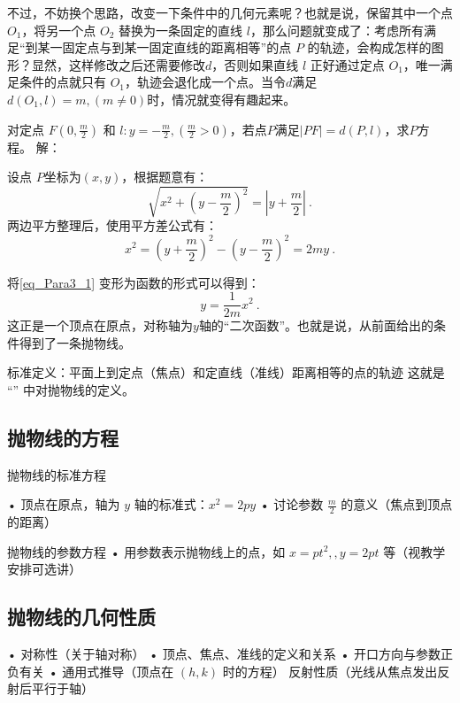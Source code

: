 不过，不妨换个思路，改变一下条件中的几何元素呢？也就是说，保留其中一个点 $O_1$，将另一个点 $O_2$ 替换为一条固定的直线 $l$，那么问题就变成了：考虑所有满足“到某一固定点与到某一固定直线的距离相等”的点 $P$ 的轨迹，会构成怎样的图形？显然，这样修改之后还需要修改$d$，否则如果直线 $l$ 正好通过定点 $O_1$，唯一满足条件的点就只有 $O_1$，轨迹会退化成一个点。当令$d$满足 $d(O_1,l)=m,(m\neq0)$时，情况就变得有趣起来。

\begin{example}{对定点 $F\left(0, \displaystyle\frac{m}{2}\right)$ 和 $l:y=-\displaystyle\frac{m}{2},\left(\frac{m}{2}>0\right)$，若点$P$满足$|PF|=d(P,l)$，求$P$方程。}
解：

设点 $P$坐标为$(x, y)$，根据题意有：
\begin{equation}
\sqrt{x^2+\left(y-\frac{m}{2}\right)^2}=\left|y +\frac{m}{2}\right|~.
\end{equation}
两边平方整理后，使用平方差公式有：
\begin{equation}\label{eq_Para3_1}
x^2=\left(y+\frac{m}{2}\right)^2-\left(y-\frac{m}{2}\right)^2=2my~.
\end{equation}
\end{example}

将\autoref{eq_Para3_1} 变形为函数的形式可以得到：
\begin{equation}
y=\frac{1}{2m}x^2~.
\end{equation}
这正是一个顶点在原点，对称轴为$y$轴的“二次函数”。也就是说，从前面给出的条件得到了一条抛物线。

标准定义：平面上到定点（焦点）和定直线（准线）距离相等的点的轨迹
这就是 “” 中对抛物线的定义。

\subsection{抛物线的方程}

\begin{theorem}{抛物线的标准方程}

\end{theorem}
	•	顶点在原点，轴为 $y$ 轴的标准式：$x^2=2py$
	•	讨论参数 $\displaystyle\frac{m}{2}$ 的意义（焦点到顶点的距离）
\begin{theorem}{抛物线的参数方程}
	•	用参数表示抛物线上的点，如 $x=pt^2,,y=2pt$ 等（视教学安排可选讲）
\end{theorem}

\subsection{抛物线的几何性质}
	•	对称性（关于轴对称）
	•	顶点、焦点、准线的定义和关系
	•	开口方向与参数正负有关
	•	通用式推导（顶点在 $(h,k)$ 时的方程）
    反射性质（光线从焦点发出反射后平行于轴）

